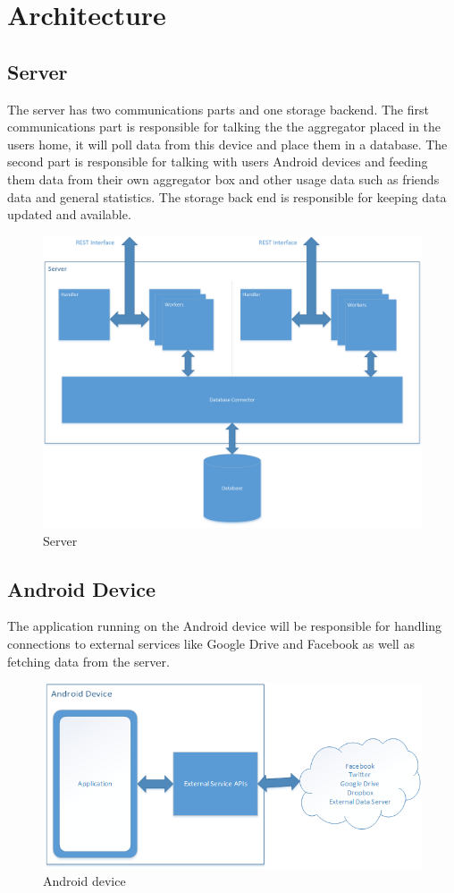 \section{Architecture}
\subsection{Server}
The server has two communications parts and one storage backend. The first communications part is responsible for talking the the aggregator placed in the users home, it will poll data from this device and place them in a database. The second part is responsible for talking with users Android devices and feeding them data from their own aggregator box and other usage data such as friends data and general statistics. The storage back end is responsible for keeping data updated and available.

\begin{figure}[H]
\includegraphics[width=\textwidth]{ch/projectPlan/fig/server.png}
\caption{Server}
\end{figure}

\subsection{Android Device}
The application running on the Android device will be responsible for handling connections to external services like Google Drive and Facebook as well as fetching data from the server.

\begin{figure}[H]
\includegraphics[width=\textwidth]{ch/projectPlan/fig/androidDevice.png}
\caption{Android device}
\end{figure}


